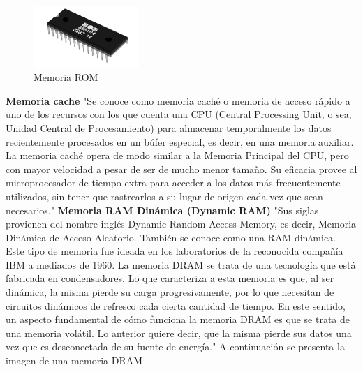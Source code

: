 \documentclass{article}
\begin{document}
\begin{figure}[h]
\includegraphics[width=4cm]{memoria-ROM.jpg}\centering
\caption{Memoria ROM}
\label{fig:memoria-ROM}
\end{figure}
\newline 
\newline 
\textbf{Memoria cache}
\newline
\newline
"Se conoce como memoria caché o memoria de acceso rápido a uno de los recursos con los que cuenta una CPU (Central Processing Unit, o sea, Unidad Central de Procesamiento) para almacenar temporalmente los datos recientemente procesados en un búfer especial, es decir, en una memoria auxiliar.
\newline
La memoria caché opera de modo similar a la Memoria Principal del CPU, pero con mayor velocidad a pesar de ser de mucho menor tamaño. Su eficacia provee al microprocesador de tiempo extra para acceder a los datos más frecuentemente utilizados, sin tener que rastrearlos a su lugar de origen cada vez que sean necesarios."\cite{Cache}
\newline
\newline
\textbf{Memoria RAM Dinámica (Dynamic RAM)}
\newline
\newline
"Sus siglas provienen del nombre inglés Dynamic Random Access Memory, es decir, Memoria Dinámica de Acceso Aleatorio. También se conoce como una RAM dinámica. Este tipo de memoria fue ideada en los laboratorios de la reconocida compañía IBM a mediados de 1960.
\newline
La memoria DRAM se trata de una tecnología que está fabricada en condensadores. Lo que caracteriza a esta memoria es que, al ser dinámica, la misma pierde su carga progresivamente, por lo que necesitan de circuitos dinámicos de refresco cada cierta cantidad de tiempo.
\newline
En este sentido, un aspecto fundamental de cómo funciona la memoria DRAM es que se trata de una memoria volátil. Lo anterior quiere decir, que la misma pierde sus datos una vez que es desconectada de su fuente de energía."\cite{DRAM}
\newline
\newline
A continuación se presenta la imagen de una memoria DRAM
\end{document}
